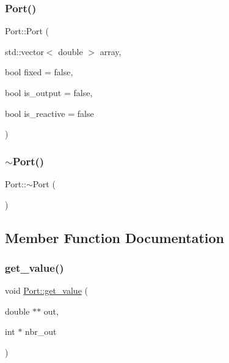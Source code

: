 \subsubsection{\texorpdfstring{Port()}{Port()}\hspace{0.1cm}{\footnotesize\ttfamily [3/3]}}
{\footnotesize\ttfamily Port\+::\+Port (\begin{DoxyParamCaption}\item[{std\+::vector$<$ double $>$}]{array,  }\item[{bool}]{fixed = {\ttfamily false},  }\item[{bool}]{is\+\_\+output = {\ttfamily false},  }\item[{bool}]{is\+\_\+reactive = {\ttfamily false} }\end{DoxyParamCaption})\hspace{0.3cm}{\ttfamily [inline]}}

\mbox{\label{class_port_afe166c2a6b10ad34d47472a150366bc1}} 
\subsubsection{\texorpdfstring{$\sim$\+Port()}{~Port()}}
{\footnotesize\ttfamily Port\+::$\sim$\+Port (\begin{DoxyParamCaption}{ }\end{DoxyParamCaption})\hspace{0.3cm}{\ttfamily [inline]}}



\subsection{Member Function Documentation}
\mbox{\label{class_port_acc11e1890530dd4bc0b9e3c7778ef5ff}} 
\subsubsection{\texorpdfstring{get\+\_\+value()}{get\_value()}\hspace{0.1cm}{\footnotesize\ttfamily [1/2]}}
{\footnotesize\ttfamily void \hyperlink{class_port_1_1get__value}{Port\+::get\+\_\+value} (\begin{DoxyParamCaption}\item[{double $\ast$$\ast$}]{out,  }\item[{int $\ast$}]{nbr\+\_\+out }\end{DoxyParamCaption})\hspace{0.3cm}{\ttfamily [virtual]}}



